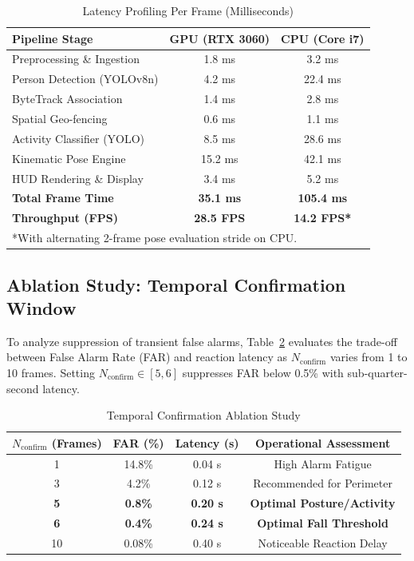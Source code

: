 \documentclass[conference]{IEEEtran}
\begin{document}
\begin{table}[htbp]
\caption{Latency Profiling Per Frame (Milliseconds)}
\begin{center}
\begin{tabular}{lcc}
\toprule
\textbf{Pipeline Stage} & \textbf{GPU (RTX 3060)} & \textbf{CPU (Core i7)} \\
\midrule
Preprocessing \& Ingestion & 1.8 ms & 3.2 ms \\
Person Detection (YOLOv8n) & 4.2 ms & 22.4 ms \\
ByteTrack Association & 1.4 ms & 2.8 ms \\
Spatial Geo-fencing & 0.6 ms & 1.1 ms \\
Activity Classifier (YOLO) & 8.5 ms & 28.6 ms \\
Kinematic Pose Engine & 15.2 ms & 42.1 ms \\
HUD Rendering \& Display & 3.4 ms & 5.2 ms \\
\midrule
\textbf{Total Frame Time} & \textbf{35.1 ms} & \textbf{105.4 ms} \\
\textbf{Throughput (FPS)} & \textbf{28.5 FPS} & \textbf{14.2 FPS*} \\
\bottomrule
\multicolumn{3}{l}{*With alternating 2-frame pose evaluation stride on CPU.}
\end{tabular}
\label{tab:latency}
\end{center}
\end{table}

\subsection{Ablation Study: Temporal Confirmation Window}
To analyze suppression of transient false alarms, Table~\ref{tab:ablation} evaluates the trade-off between False Alarm Rate (FAR) and reaction latency as $N_{\text{confirm}}$ varies from 1 to 10 frames. Setting $N_{\text{confirm}} \in [5, 6]$ suppresses FAR below 0.5\% with sub-quarter-second latency.

\begin{table}[htbp]
\caption{Temporal Confirmation Ablation Study}
\begin{center}
\begin{tabular}{cccc}
\toprule
\textbf{$N_{\text{confirm}}$ (Frames)} & \textbf{FAR (\%)} & \textbf{Latency (s)} & \textbf{Operational Assessment} \\
\midrule
1 & 14.8\% & 0.04 s & High Alarm Fatigue \\
3 & 4.2\% & 0.12 s & Recommended for Perimeter \\
\textbf{5} & \textbf{0.8\%} & \textbf{0.20 s} & \textbf{Optimal Posture/Activity} \\
\textbf{6} & \textbf{0.4\%} & \textbf{0.24 s} & \textbf{Optimal Fall Threshold} \\
10 & 0.08\% & 0.40 s & Noticeable Reaction Delay \\
\bottomrule
\end{tabular}
\label{tab:ablation}
\end{center}
\end{table}
\end{document}

